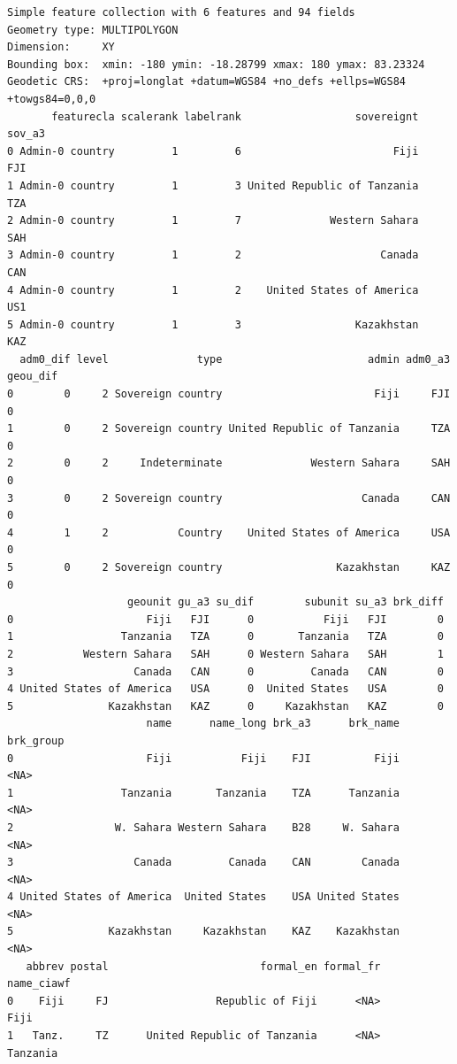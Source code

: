 \documentclass[
]{article}
\begin{document}
\begin{verbatim}
Simple feature collection with 6 features and 94 fields
Geometry type: MULTIPOLYGON
Dimension:     XY
Bounding box:  xmin: -180 ymin: -18.28799 xmax: 180 ymax: 83.23324
Geodetic CRS:  +proj=longlat +datum=WGS84 +no_defs +ellps=WGS84 +towgs84=0,0,0
       featurecla scalerank labelrank                  sovereignt sov_a3
0 Admin-0 country         1         6                        Fiji    FJI
1 Admin-0 country         1         3 United Republic of Tanzania    TZA
2 Admin-0 country         1         7              Western Sahara    SAH
3 Admin-0 country         1         2                      Canada    CAN
4 Admin-0 country         1         2    United States of America    US1
5 Admin-0 country         1         3                  Kazakhstan    KAZ
  adm0_dif level              type                       admin adm0_a3 geou_dif
0        0     2 Sovereign country                        Fiji     FJI        0
1        0     2 Sovereign country United Republic of Tanzania     TZA        0
2        0     2     Indeterminate              Western Sahara     SAH        0
3        0     2 Sovereign country                      Canada     CAN        0
4        1     2           Country    United States of America     USA        0
5        0     2 Sovereign country                  Kazakhstan     KAZ        0
                   geounit gu_a3 su_dif        subunit su_a3 brk_diff
0                     Fiji   FJI      0           Fiji   FJI        0
1                 Tanzania   TZA      0       Tanzania   TZA        0
2           Western Sahara   SAH      0 Western Sahara   SAH        1
3                   Canada   CAN      0         Canada   CAN        0
4 United States of America   USA      0  United States   USA        0
5               Kazakhstan   KAZ      0     Kazakhstan   KAZ        0
                      name      name_long brk_a3      brk_name brk_group
0                     Fiji           Fiji    FJI          Fiji      <NA>
1                 Tanzania       Tanzania    TZA      Tanzania      <NA>
2                W. Sahara Western Sahara    B28     W. Sahara      <NA>
3                   Canada         Canada    CAN        Canada      <NA>
4 United States of America  United States    USA United States      <NA>
5               Kazakhstan     Kazakhstan    KAZ    Kazakhstan      <NA>
   abbrev postal                        formal_en formal_fr     name_ciawf
0    Fiji     FJ                 Republic of Fiji      <NA>           Fiji
1   Tanz.     TZ      United Republic of Tanzania      <NA>       Tanzania

\end{verbatim}
\end{document}
